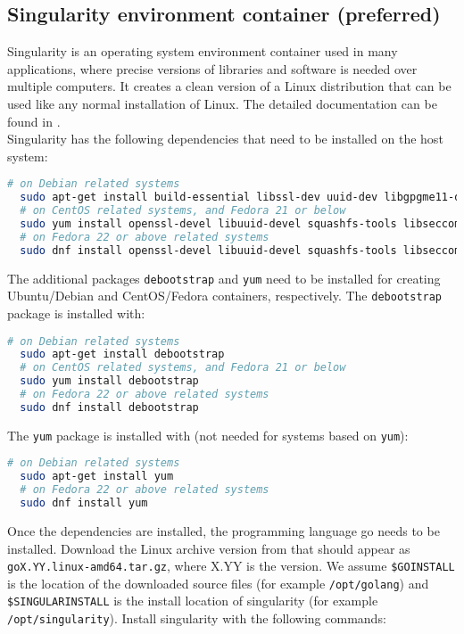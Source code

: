\documentclass[12pt,a4paper]{report}
\begin{document}
\subsection{Singularity environment container (preferred)}
Singularity \cite{singularity} is an operating system environment container used in many applications, where precise versions of libraries and software is needed over multiple computers. It creates a clean version of a Linux distribution that can be used like any normal installation of Linux. The detailed documentation can be found in \cite{singularitydoc}.\\
Singularity has the following dependencies that need to be installed on the host system:
\begin{lstlisting}[language=bash]
  # on Debian related systems
  sudo apt-get install build-essential libssl-dev uuid-dev libgpgme11-dev squashfs-tools libseccomp-dev pkg-config
  # on CentOS related systems, and Fedora 21 or below
  sudo yum install openssl-devel libuuid-devel squashfs-tools libseccomp-devel
  # on Fedora 22 or above related systems
  sudo dnf install openssl-devel libuuid-devel squashfs-tools libseccomp-devel
\end{lstlisting}
The additional packages \texttt{debootstrap} and \texttt{yum} need to be installed for creating Ubuntu/Debian and CentOS/Fedora containers, respectively. The \texttt{debootstrap} package is installed with:
\begin{lstlisting}[language=bash]
  # on Debian related systems
  sudo apt-get install debootstrap
  # on CentOS related systems, and Fedora 21 or below
  sudo yum install debootstrap
  # on Fedora 22 or above related systems
  sudo dnf install debootstrap
\end{lstlisting}
The \texttt{yum} package is installed with (not needed for systems based on \texttt{yum}):
\begin{lstlisting}[language=bash]
  # on Debian related systems
  sudo apt-get install yum
  # on Fedora 22 or above related systems
  sudo dnf install yum
\end{lstlisting}
Once the dependencies are installed, the programming language go needs to be installed. Download the Linux archive version from \cite{godown} that should appear as \texttt{goX.YY.linux-amd64.tar.gz}, where X.YY is the version. We assume \texttt{\$GOINSTALL} is the location of the downloaded source files (for example \linebreak\texttt{/opt/golang}) and \texttt{\$SINGULARINSTALL} is the install location of singularity (for example \texttt{/opt/singularity}). Install singularity with the following commands:
\end{document}
